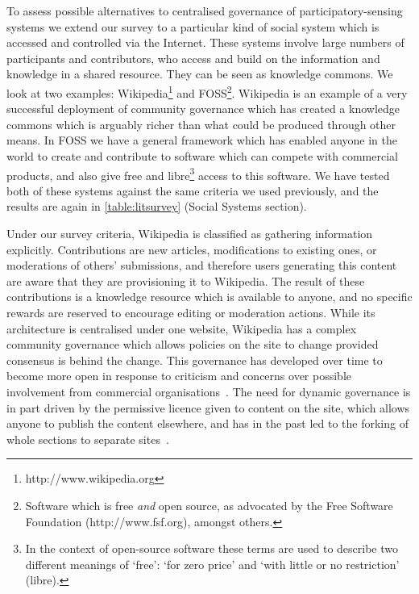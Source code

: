 To assess possible alternatives to centralised governance of participatory-sensing systems we extend our survey to a particular kind of social system which is accessed and controlled via the Internet. 
These systems involve large numbers of participants and contributors, who access and build on the information and knowledge in a shared resource. They can be seen as knowledge commons. We look at two examples: Wikipedia\footnote{http://www.wikipedia.org} and \ac{FOSS}\footnote{Software which is free \emph{and} open source, as advocated by the Free Software Foundation (http://www.fsf.org), amongst others.}. Wikipedia is an example of a very successful deployment of community governance which has created a knowledge commons which is arguably richer than what could be produced through other means. 
In \ac{FOSS} we have a general framework which has enabled anyone in the world to create and contribute to software which can compete with commercial products, and also give free and libre\footnote{In the context of open-source software these terms are used to describe two different meanings of `free': `for zero price' and `with little or no restriction' (libre).} access to this software. 
We have tested both of these systems against the same criteria we used previously, and the results are again in \autoref{table:litsurvey} (Social Systems section).

Under our survey criteria, Wikipedia is classified as gathering information explicitly. Contributions are new articles, modifications to existing ones, or moderations of others' submissions, and therefore users generating this content are aware that they are provisioning it to Wikipedia. The result of these contributions is a knowledge resource which is available to anyone, and no specific rewards are reserved to encourage editing or moderation actions. While its architecture is centralised under one website, Wikipedia has a complex community governance which allows policies on the site to change provided consensus is behind the change. This governance has developed over time to become more open in response to criticism and concerns over possible involvement from commercial organisations~\citep{MayoFusterMorell2011}. The need for dynamic governance is in part driven by the permissive licence given to content on the site, which allows anyone to publish the content elsewhere, and has in the past led to the forking of whole sections to separate sites~\citep{Famiglietti2011}.

